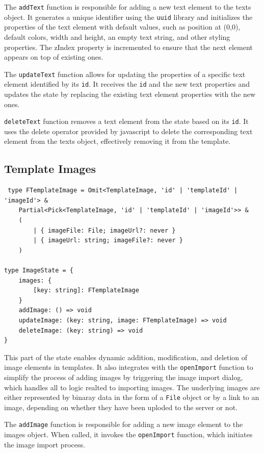 The \texttt{addText} function is responsible for adding a new text element to the texts object. It generates a unique identifier using the \texttt{uuid} library and initializes the properties of the text element with default values, such as position at (0,0), default colors, width and height, an empty text string, and other styling properties. The zIndex property is incremented to ensure that the next element appears on top of existing ones.

The \texttt{updateText} function allows for updating the properties of a specific text element identified by its \texttt{id}. It receives the \texttt{id} and the new text properties and updates the state by replacing the existing text element properties with the new ones.

\texttt{deleteText} function removes a text element from the state based on its \texttt{id}. It uses the delete operator provided by javascript to delete the corresponding text element from the texts object, effectively removing it from the template.

\subsection{Template Images}
\begin{verbatim}
 type FTemplateImage = Omit<TemplateImage, 'id' | 'templateId' | 'imageId'> &
    Partial<Pick<TemplateImage, 'id' | 'templateId' | 'imageId'>> &
    (
        | { imageFile: File; imageUrl?: never }
        | { imageUrl: string; imageFile?: never }
    )

type ImageState = {
    images: {
        [key: string]: FTemplateImage
    }
    addImage: () => void
    updateImage: (key: string, image: FTemplateImage) => void
    deleteImage: (key: string) => void
}
\end{verbatim}

This part of the state enables dynamic addition, modification, and deletion of image elements in templates. It also integrates with the \texttt{openImport} function to simplify the process of adding images by triggering the image import dialog, which handles all to logic realted to importing images. The underlying images are either represented by binaray data in the form of a \texttt{File} object or by a link to an image, depending on whether they have been uploded to the server or not.

The \texttt{addImage} function is responsible for adding a new image element to the images object. When called, it invokes the \texttt{openImport} function, which initiates the image import process.


